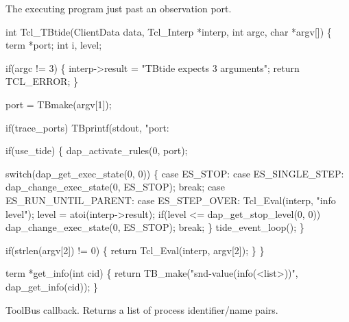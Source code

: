 

The executing program just past an observation port.

\nwenddocs{}\endmoddef\let\nwnotused=\nwoutput{}
int Tcl_TBtide(ClientData data, Tcl_Interp *interp, int argc, char *argv[])
\{
  term *port;
  int i, level;

  if(argc != 3) \{
    interp->result = "TBtide expects 3 arguments";
    return TCL_ERROR;
  \}

  port = TBmake(argv[1]);

  if(trace_ports)
    TBprintf(stdout, "port: %

  if(use_tide) \{
    dap_activate_rules(0, port);

    switch(dap_get_exec_state(0, 0)) \{
      case ES_STOP:             
      case ES_SINGLE_STEP:      dap_change_exec_state(0, ES_STOP);
                                break;
      case ES_RUN_UNTIL_PARENT:
      case ES_STEP_OVER:        Tcl_Eval(interp, "info level");
                                level = atoi(interp->result);
                                if(level <= dap_get_stop_level(0, 0))
                                  dap_change_exec_state(0, ES_STOP);
                                break;
    \}
    tide_event_loop();
  \}

  if(strlen(argv[2]) != 0) \{
    return Tcl_Eval(interp, argv[2]);
  \}
\}
\nwendcode{}\nwdocspar



\nwenddocs{}\endmoddef\let\nwnotused=\nwoutput{}
term *get_info(int cid)
\{
  return TB_make("snd-value(info(<list>))", dap_get_info(cid));
\}
\nwendcode{}\nwdocspar


ToolBus callback. Returns a list of process identifier/name pairs.

